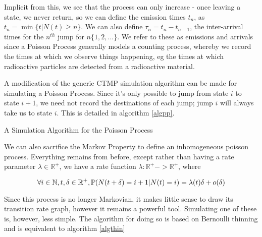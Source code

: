 Implicit from this, we see that the process can only increase - once leaving a state, we never return, so we can define the emission times $t_n$, as $t_n = \min\{t | N(t)\geqslant n\}$. We can also define $\tau_n = t_n-t_{n-1}$, the inter-arrival times for the $n^{th}$ jump for $n \{1,2,...\}$. We refer to these as emissions and arrivals since a Poisson Process generally models a counting process, whereby we record the times at which we observe things happening, eg the times at which radioactive particles are detected from a radioactive material.

A modification of the generic CTMP simulation algorithm can be made for simulating  a Poisson Process. Since it's only possible to jump from state $i$ to state $i+1$, we need not record the destinations of each jump; jump $i$ will always take us to state $i$. This is detailed in algorithm \ref{algpp}.

\begin{algorithm}
\SetAlgoLined
{}

\caption{A Simulation Algorithm for the Poisson Process}\label{algpp}

\end{algorithm}

We can also sacrifice the Markov Property to define an inhomogeneous poisson process. Everything remains from before, except rather than having a rate parameter $\lambda \in \mathbb{R}^{+}$, we have a rate function $\lambda : \mathbb{R}^{+} -> \mathbb{R}^{+}$, where

$$
\forall i \in \mathbb{N}, t,\delta \in \mathbb{R}^{+}, \mathbb{P} (N(t+\delta) = i+1 | N(t) = i) = \lambda(t) \delta + o(\delta)
$$

Since this process is no longer Markovian, it makes little sense to draw its transition rate graph, however it remains a powerful tool. Simulating one of these is, however, less simple. The algorithm for doing so is based on Bernoulli thinning %
and is equivalent to algorithm \ref{algthin}

